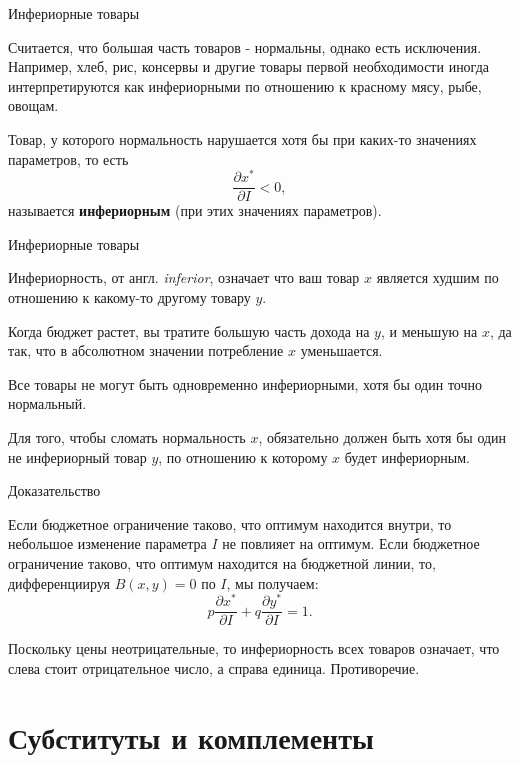 \documentclass{beamer}
\begin{document}
\begin{frame}{Инфериорные товары}

Считается, что большая часть товаров - нормальны, однако есть исключения. Например, хлеб, рис, консервы и другие товары первой необходимости иногда интерпретируются как инфериорными по отношению к красному мясу, рыбе, овощам. 

\begin{definition}
Товар, у которого нормальность нарушается хотя бы при каких-то значениях параметров, то есть 
$$\frac{\partial x^{\ast}}{\partial I} < 0,$$ 
называется \textbf{инфериорным} (при этих значениях параметров). 
\end{definition}
\end{frame}

\begin{frame}{Инфериорные товары}

Инфериорность, от англ. \textit{inferior}, означает что ваш товар $x$ является худшим по отношению к какому-то другому товару $y$. 

Когда бюджет растет, вы тратите большую часть дохода на $y$, и меньшую на $x$, да так, что в абсолютном значении потребление $x$ уменьшается. 

\begin{lemma}
Все товары не могут быть одновременно инфериорными, хотя бы один точно нормальный.
\end{lemma}

Для того, чтобы сломать нормальность $x$, обязательно должен быть хотя бы один не инфериорный товар $y$, по отношению к которому $x$ будет инфериорным.

\end{frame}

\begin{frame}{Доказательство}

Если бюджетное ограничение таково, что оптимум находится внутри, то небольшое изменение параметра $I$ не повлияет на оптимум. Если бюджетное ограничение таково, что оптимум находится на бюджетной линии, то, дифференциируя $B(x,y)= 0$ по $I$, мы получаем: 
$$ p \frac{\partial x^{\ast}}{\partial I}  + q \frac{\partial y^{\ast}}{\partial I}  = 1.$$ 

Поскольку цены неотрицательные, то инфериорность всех товаров означает, что слева стоит отрицательное число, а справа единица. Противоречие.

\end{frame}

\section{Субституты и комплементы}
\end{document}
